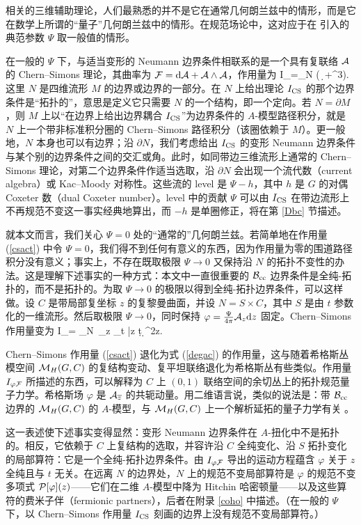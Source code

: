 相关的三维辅助理论，人们最熟悉的并不是它在通常几何朗兰兹中的情形，而是它在数学上所谓的“量子”几何朗兰兹中的情形。在规范场论中，这对应于在 \cite{KW} 引入的典范参数 $\Psi$ 取一般值的情形。

在一般的 $\Psi$ 下，与适当变形的 Neumann 边界条件相联系的是一个具有复联络 ${\mathcal A}$ 的 Chern–Simons 理论，其曲率为 ${\mathcal F}={\mathrm d} {\mathcal A}+{\mathcal A}\wedge {\mathcal A}$，作用量为
\be\label{csact} I_\CS =\frac{\Psi}{4\pi}\int_N \left( \Tr\,\cA\wedge \d \cA +\cA^3\right). \ee
这里 $N$ 是四维流形 $M$ 的边界或边界的一部分。在 $N$ 上给出理论 $I_{\mathrm{CS}}$ 的那个边界条件是“拓扑的”，意思是定义它只需要 $N$ 的一个结构，即一个定向。若 $N=\partial M$，则 $M$ 上以“在边界上给出边界耦合 $I_{\mathrm{CS}}$”为边界条件的 $A$-模型路径积分，就是 $N$ 上一个带非标准积分圈的 Chern–Simons 路径积分（该圈依赖于 $M$）。更一般地，$N$ 本身也可以有边界；沿 $\partial N$，我们考虑给出 $I_{\mathrm{CS}}$ 的变形 Neumann 边界条件与某个别的边界条件之间的交汇或角。此时，如同带边三维流形上通常的 Chern–Simons 理论，对第二个边界条件作适当选取，沿 $\partial N$ 会出现一个流代数（current algebra）或 Kac–Moody 对称性。这些流的 level 是 $\Psi-h$，其中 $h$ 是 $G$ 的对偶 Coxeter 数（dual Coxeter number）。level 中的贡献 $\Psi$ 可以由 $I_{\mathrm{CS}}$ 在带边流形上不再规范不变这一事实经典地算出，而 $-h$ 是单圈修正，将在第 \ref{Dbc} 节描述。

就本文而言，我们关心 $\Psi=0$ 处的“通常的”几何朗兰兹。若简单地在作用量 (\ref{csact}) 中令 $\Psi=0$，我们得不到任何有意义的东西，因为作用量为零的围道路径积分没有意义；事实上，不存在既取极限 $\Psi\to 0$ 又保持沿 $N$ 的拓扑不变性的办法。这是理解下述事实的一种方式：本文中一直很重要的 ${\mathcal B}_{\mathrm{cc}}$ 边界条件是全纯-拓扑的，而不是拓扑的。为取 $\Psi\to 0$ 的极限以得到全纯-拓扑边界条件，可以这样做。设 $C$ 是带局部复坐标 $z$ 的复黎曼曲面，并设 $N=S\times C$，其中 $S$ 是由 $t$ 参数化的一维流形。然后取极限 $\Psi\to 0$，同时保持 $\varphi=\frac{\Psi}{4\pi} {\mathcal A}_z{\mathrm d} z$ 固定。Chern–Simons 作用量变为
\be\label{degac}
I_{\varphi\cF}= 
\int _N\Tr\, \varphi_z \cF_{t \bar z} \d t \d^2z.
\ee

Chern–Simons 作用量 (\ref{csact}) 退化为式 (\ref{degac}) 的作用量，这与随着希格斯丛模空间 ${\mathcal M}_H(G,C)$ 的复结构变动、复平坦联络退化为希格斯丛有些类似。作用量 $I_{\varphi{\mathcal F}} $ 所描述的东西，可以解释为 $C$ 上 $(0,1)$ 联络空间的余切丛上的拓扑规范量子力学。希格斯场 $\varphi$ 是 ${\mathcal A}_{\overline z}$ 的共轭动量。用二维语言说，类似的说法是：带 ${\mathcal B}_{\mathrm{cc}}$ 边界的 ${\mathcal M}_H(G,C)$ 的 $A$-模型，与 ${\mathcal M}_H(G,C)$ 上一个解析延拓的量子力学有关 \cite{Witten:2010zr}。

这一表述使下述事实变得显然：变形 Neumann 边界条件在 $A$-扭化中不是拓扑的。相反，它依赖于 $C$ 上复结构的选取，并容许沿 $C$ 全纯变化、沿 $S$ 拓扑变化的局部算符：它是一个全纯-拓扑边界条件。由 $I_{\varphi{\mathcal F}}$ 导出的运动方程蕴含 $\varphi$ 关于 $z$ 全纯且与 $t$ 无关。在远离 $N$ 的边界处，$N$ 上的规范不变局部算符是 $\varphi$ 的规范不变多项式 ${\cal P}[\varphi](z)$——它们在二维 $A$-模型中降为 Hitchin 哈密顿量——以及这些算符的费米子伴（fermionic partners），后者在附录 \ref{coho} 中描述。（在一般的 $\Psi$ 下，以 Chern–Simons 作用量 $I_{\mathrm{CS}}$ 刻画的边界上没有规范不变局部算符。）

